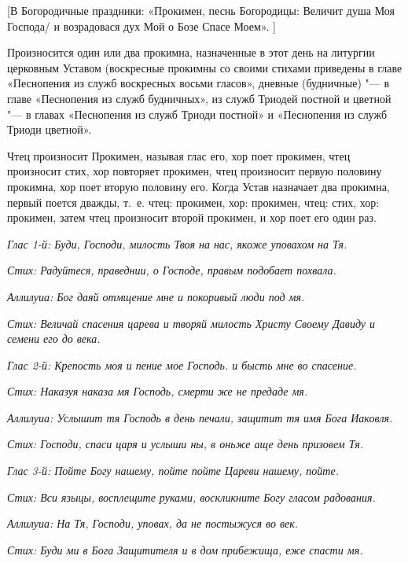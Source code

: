 [В Богородичные праздники: «Прокимен, песнь Богородицы: Величит душа Моя Господа/ и возрадовася дух Мой о Бозе Спасе Моем». ]


Произносится один или два прокимна, назначенные в этот день на литургии церковным Уставом (воскресные прокимны со своими стихами приведены в главе «Песнопения из служб воскресных восьми гласов», дневные (будничные) "--- в главе «Песнопения из служб будничных», из служб Триодей постной и цветной "--- в главах «Песнопения из служб Триоди постной» и «Песнопения из служб Триоди цветной».


Чтец произносит Прокимен, называя глас его, хор поет прокимен, чтец произносит стих, хор повторяет прокимен, чтец произносит первую половину прокимна, хор поет вторую половину его. Когда Устав назначает два прокимна, первый поется дважды, т.~е. чтец: прокимен, хор: прокимен, чтец: стих, хор: прокимен, затем чтец произносит второй прокимен, и хор поет его один раз.




\itshape Глас 1-й:\normalfont{} Буди, Господи, милость Твоя на нас, якоже уповахом на Тя.


\itshape Стих:\normalfont{} Радуйтеся, праведнии, о Господе, правым подобает похвала.


\itshape Аллилуиа:\normalfont{} Бог даяй отмщение мне и покоривый люди под мя.


\itshape Стих:\normalfont{} Величай спасения царева и творяй милость Христу Своему Давиду и семени его до века.


\itshape Глас 2-й:\normalfont{} Крепость моя и пение мое Господь. и бысть мне во спасение.


\itshape Стих:\normalfont{} Наказуя наказа мя Господь, смерти же не предаде мя.


\itshape Аллилуиа:\normalfont{} Услышит тя Господь в день печали, защитит тя имя Бога Иаковля.


\itshape Стих:\normalfont{} Господи, спаси царя и услыши ны, в оньже аще день призовем Тя.


\itshape Глас 3-й:\normalfont{} Пойте Богу нашему, пойте пойте Цареви нашему, пойте.


\itshape Стих:\normalfont{} Вси языцы, восплещите руками, воскликните Богу гласом радования.


\itshape Аллилуиа:\normalfont{} На Тя, Господи, уповах, да не постыжуся во век.


\itshape Стих:\normalfont{} Буди ми в Бога Защитителя и в дом прибежища, еже спасти мя.



